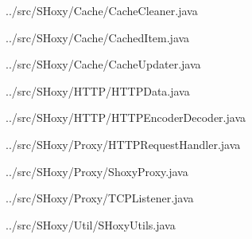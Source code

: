 \documentclass[11pt]{article}
\begin{document}
\begin{tiny}

\begin{lstinputlisting}[language=Java]{../src/SHoxy/Cache/CacheCleaner.java}
\end{lstinputlisting}
\begin{lstinputlisting}[language=Java]{../src/SHoxy/Cache/CachedItem.java}
\end{lstinputlisting}
\begin{lstinputlisting}[language=Java]{../src/SHoxy/Cache/CacheUpdater.java}
\end{lstinputlisting}
\begin{lstinputlisting}[language=Java]{../src/SHoxy/HTTP/HTTPData.java}
\end{lstinputlisting}
\begin{lstinputlisting}[language=Java]{../src/SHoxy/HTTP/HTTPEncoderDecoder.java}
\end{lstinputlisting}
\begin{lstinputlisting}[language=Java]{../src/SHoxy/Proxy/HTTPRequestHandler.java}
\end{lstinputlisting}
\begin{lstinputlisting}[language=Java]{../src/SHoxy/Proxy/ShoxyProxy.java}
\end{lstinputlisting}
\begin{lstinputlisting}[language=Java]{../src/SHoxy/Proxy/TCPListener.java}
\end{lstinputlisting}
\begin{lstinputlisting}[language=Java]{../src/SHoxy/Util/SHoxyUtils.java}
\end{lstinputlisting}

\end{tiny}
\end{document}
